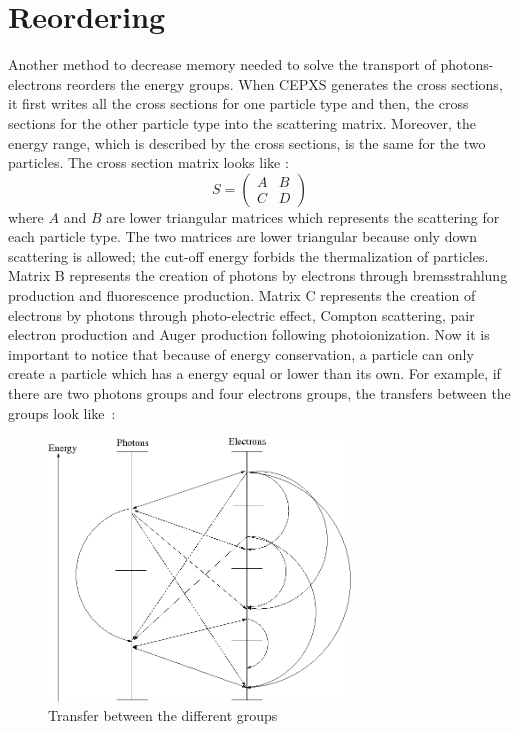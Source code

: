 \section{Reordering}
Another method to decrease memory needed to solve the transport of
photons-electrons reorders the energy groups. When CEPXS generates the cross sections,
it first writes all the cross sections for one particle type and then, the cross
sections for the other particle type into the scattering matrix. Moreover, the
energy range, which is described by the cross sections, is the same for the two
particles. The cross section matrix looks like :
\begin{equation}
S = 
\begin{pmatrix}
A & B\\
C & D
\end{pmatrix}
\end{equation}
where $A$ and $B$ are lower triangular matrices which represents the
scattering for each particle type. The two matrices are lower triangular
because only down scattering is allowed; the cut-off energy forbids the 
thermalization of particles. Matrix B represents the creation of photons by
electrons through bremsstrahlung production and fluorescence production.
Matrix C represents the creation of electrons by photons through photo-electric 
effect, Compton scattering, pair electron production and Auger production 
following photoionization. Now it is important to notice that because 
of energy conservation, a particle can only create a particle which has a 
energy equal or lower than its own. For example, if there are two photons
groups and four electrons groups, the transfers between the groups
look \hbox{like :}
\begin{figure}[H]
\begin{center}
\includegraphics[height=7cm]{group.png}
\caption{Transfer between the different groups}        
\label{joli}
\end{center}
\end{figure}
